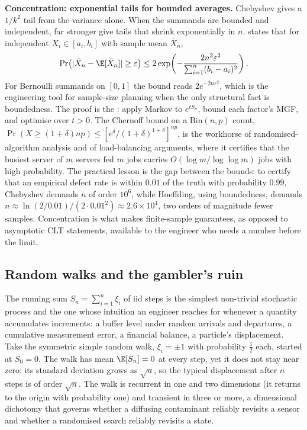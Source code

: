 \begin{mastery}
\textbf{Concentration: exponential tails for bounded averages.}
Chebyshev gives a $1/k^{2}$ tail from the variance alone. When the
summands are bounded and independent, far stronger
 give tails that shrink
exponentially in $n$.  states that for
independent $X_{i} \in [a_{i}, b_{i}]$ with sample mean $\bar X_{n}$,
\[
\Pr\!\left( |\bar X_{n} - \E[\bar X_{n}]| \geq \varepsilon \right)
\leq 2 \exp\!\left( -\frac{2 n^{2} \varepsilon^{2}}
{\sum_{i=1}^{n} (b_{i} - a_{i})^{2}} \right).
\]
For Bernoulli summands on $[0, 1]$ the bound reads $2 e^{-2 n
\varepsilon^{2}}$, which is the engineering tool for sample-size
planning when the only structural fact is boundedness. The proof is
the : apply Markov to $e^{t S_{n}}$, bound
each factor's MGF, and optimise over $t > 0$. The Chernoff bound on a
$\mathrm{Bin}(n, p)$ count, $\Pr(X \geq (1 + \delta) np) \leq
[e^{\delta}/(1 + \delta)^{1 + \delta}]^{np}$, is the workhorse of
randomised-algorithm analysis and of load-balancing arguments, where
it certifies that the busiest server of $m$ servers fed $m$ jobs
carries $O(\log m / \log\log m)$ jobs with high probability. The
practical lesson is the gap between the bounds: to certify that an
empirical defect rate is within $0.01$ of the truth with probability
$0.99$, Chebyshev demands $n$ of order $10^{6}$, while Hoeffding,
using boundedness, demands $n \approx \ln(2/0.01)/(2 \cdot 0.01^{2})
\approx 2.6 \times 10^{4}$, two orders of magnitude fewer samples.
Concentration is what makes finite-sample guarantees, as opposed to
asymptotic CLT statements, available to the engineer who needs a
number before the limit.
\end{mastery}

\subsection{Random walks and the gambler's ruin}

The running sum $S_{n} = \sum_{i=1}^{n} \xi_{i}$ of iid steps is the
simplest non-trivial stochastic process and the one whose intuition an
engineer reaches for whenever a quantity accumulates increments: a
buffer level under random arrivals and departures, a cumulative
measurement error, a financial balance, a particle's displacement. Take
the symmetric simple random walk, $\xi_{i} = \pm 1$ with probability
$\tfrac12$ each, started at $S_{0} = 0$. The walk has mean $\E[S_{n}] =
0$ at every step, yet it does not stay near zero: its standard deviation
grows as $\sqrt{n}$, so the typical displacement after $n$ steps is of
order $\sqrt{n}$. The walk is recurrent in one and two dimensions (it
returns to the origin with probability one) and transient in three or
more, a dimensional dichotomy that governs whether a diffusing
contaminant reliably revisits a sensor and whether a randomised search
reliably revisits a state.

